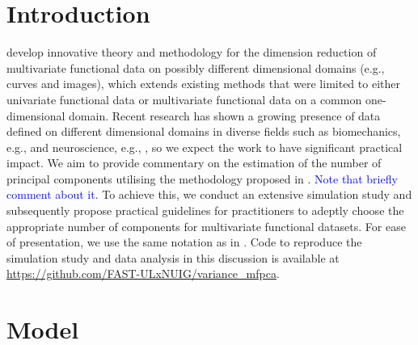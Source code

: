 
\section{Introduction} %
\label{sec:introduction}

\cite{happMultivariateFunctionalPrincipal2018} develop innovative theory and methodology for the dimension reduction of multivariate functional data on possibly different dimensional domains (e.g., curves and images), which extends existing methods that were limited to either univariate functional data or multivariate functional data on a common one-dimensional domain. Recent research has shown a growing presence of data defined on different dimensional domains in diverse fields such as biomechanics, e.g., \cite{warmenhovenBivariateFunctionalPrincipal2019} and neuroscience, e.g., \cite{songSparseMultivariateFunctional2022}, so we expect the work to have significant practical impact. We aim to provide commentary on the estimation of the number of principal components utilising the methodology proposed in \cite{happMultivariateFunctionalPrincipal2018}. \textcolor{blue}{Note that \citet[Online Supplement, Section 2.3]{happMultivariateFunctionalPrincipal2018} briefly comment about it.} To achieve this, we conduct an extensive simulation study and subsequently propose practical guidelines for practitioners to adeptly choose the appropriate number of components for multivariate functional datasets. For ease of presentation, we use the same notation as in \cite{happMultivariateFunctionalPrincipal2018}. Code to reproduce the simulation study and data analysis in this discussion is available at \url{https://github.com/FAST-ULxNUIG/variance_mfpca}.


\section{Model} %
\label{sec:model}

